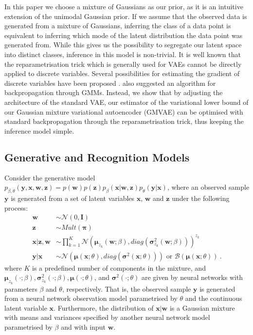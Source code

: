 \documentclass{article} \usepackage{iclr2017_conference,times}
\begin{document}
In this paper we choose a mixture of Gaussians as our prior, as it is an intuitive extension of the unimodal Gaussian prior. If we assume that the observed data is generated from a mixture of Gaussians, inferring the class of a data point is equivalent to inferring which mode of the latent distribution the data point was generated from. While this gives us the possibility to segregate our latent space into distinct classes, inference in this model is non-trivial. It is well known that the reparametrisation trick which is generally used for VAEs cannot be directly applied to discrete variables. Several possibilities for estimating the gradient of discrete variables have been proposed \citep{glynn1990likelihood, titsias2015local}. \cite{graves2016stochastic} also suggested an algorithm for backpropagation through GMMs. Instead, we show that by adjusting the architecture of the standard VAE, our estimator of the variational lower bound of our Gaussian mixture variational autoencoder (GMVAE) can be optimised with standard backpropagation through the reparametrisation trick, thus keeping the inference model simple. 

\subsection{Generative and Recognition Models}

Consider the generative model $p_{\beta, \theta}(\pmb{y},\pmb{x},\pmb{w},\pmb{z}) = p(\pmb{w})p(\pmb{z})p_{\beta}(\pmb{x}|\pmb{w},\pmb{z})p_{\theta}(\pmb{y}|\pmb{x})$, where an observed sample $\pmb{y}$ is generated from a set of latent variables $\pmb{x}$, $\pmb{w}$ and $\pmb{z}$ under the following process:
\begin{subequations}
\begin{align}
  \pmb{w} &\sim \mathcal{N}(0, \pmb{I})  \\
  \pmb{z} &\sim Mult(\pmb{\pi}) \\
  \pmb{x}|\pmb{z},\pmb{w} &\sim \prod_{k=1}^K \mathcal{N}\left(\pmb{\mu}_{z_{k}}(\pmb{w}; \beta), diag\left(\pmb{\sigma}^2_{z_{k}}(\pmb{w}; \beta)\right) \right)^{z_k} \\
  \pmb{y}|\pmb{x} &\sim \mathcal{N}\left(\pmb{\mu}(\pmb{x}; \theta), diag\left(\pmb{\sigma}^2(\pmb{x}; \theta)\right)\right) \text{ or } \mathcal{B}(\pmb{\mu}(\pmb{x}; \theta)) ~ .
\end{align}
\end{subequations}
\noindent where $K$ is a predefined number of components in the mixture, and $\pmb{\mu}_{z_k}(\cdot; \beta), \pmb{\sigma}^2_{z_k}(\cdot; \beta), \pmb{\mu}(\cdot; \theta)$, and $\pmb{\sigma}^2(\cdot; \theta)$ are given by neural networks with parameters $\beta$ and $\theta$, respectively. That is, the observed sample $\pmb{y}$ is generated from a neural network observation model parametrised by $\theta$ and the continuous latent variable $\pmb{x}$. Furthermore, the distribution of $\pmb{x}|\pmb{w}$ is a Gaussian mixture with means and variances specified by another neural network model parametrised by $\beta$ and with input $\pmb{w}$.
\end{document}

